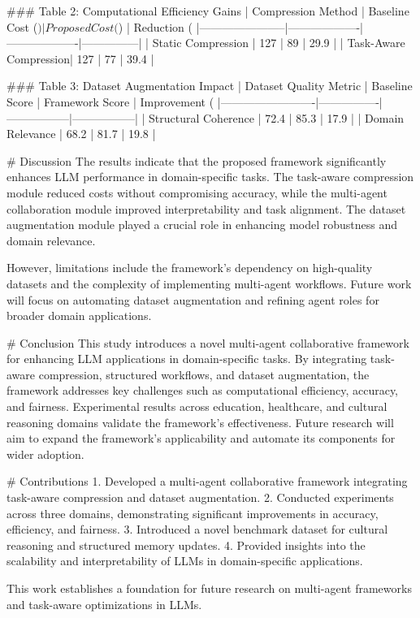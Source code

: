 ### Table 2: Computational Efficiency Gains  
| Compression Method    | Baseline Cost ($) | Proposed Cost ($) | Reduction (%
|-----------------------|-------------------|-------------------|---------------|  
| Static Compression    | 127              | 89                | 29.9          |  
| Task-Aware Compression| 127              | 77                | 39.4          |  

### Table 3: Dataset Augmentation Impact  
| Dataset Quality Metric | Baseline Score | Framework Score | Improvement (%
|-------------------------|----------------|-----------------|-----------------|  
| Structural Coherence    | 72.4          | 85.3            | 17.9           |  
| Domain Relevance        | 68.2          | 81.7            | 19.8           |  

# Discussion  
The results indicate that the proposed framework significantly enhances LLM performance in domain-specific tasks. The task-aware compression module reduced costs without compromising accuracy, while the multi-agent collaboration module improved interpretability and task alignment. The dataset augmentation module played a crucial role in enhancing model robustness and domain relevance.  

However, limitations include the framework's dependency on high-quality datasets and the complexity of implementing multi-agent workflows. Future work will focus on automating dataset augmentation and refining agent roles for broader domain applications.

# Conclusion  
This study introduces a novel multi-agent collaborative framework for enhancing LLM applications in domain-specific tasks. By integrating task-aware compression, structured workflows, and dataset augmentation, the framework addresses key challenges such as computational efficiency, accuracy, and fairness. Experimental results across education, healthcare, and cultural reasoning domains validate the framework's effectiveness. Future research will aim to expand the framework's applicability and automate its components for wider adoption.

# Contributions  
1. Developed a multi-agent collaborative framework integrating task-aware compression and dataset augmentation.  
2. Conducted experiments across three domains, demonstrating significant improvements in accuracy, efficiency, and fairness.  
3. Introduced a novel benchmark dataset for cultural reasoning and structured memory updates.  
4. Provided insights into the scalability and interpretability of LLMs in domain-specific applications.  

This work establishes a foundation for future research on multi-agent frameworks and task-aware optimizations in LLMs.